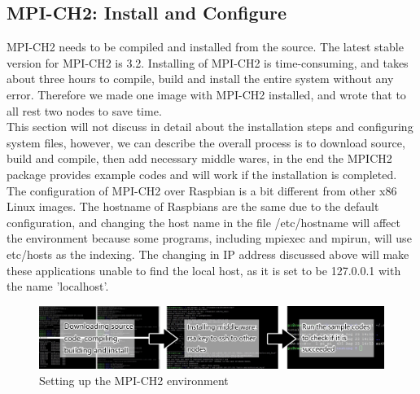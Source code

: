 \documentclass[11pt,openright,a4paper]{report}
\begin{document}
\subsection{MPI-CH2: Install and Configure}
MPI-CH2 needs to be compiled and installed from the source. The latest stable version for MPI-CH2 is 3.2. Installing of MPI-CH2 is time-consuming, and takes about three hours to compile, build and install the entire system without any error. Therefore we made one image with MPI-CH2 installed, and wrote that to all rest two nodes to save time.\\
This section will not discuss in detail about the installation steps and configuring system files, however, we can describe the overall process is to download source, build and compile, then add necessary middle wares, in the end the MPICH2 package provides example codes and will work if the installation is completed. The configuration of MPI-CH2 over Raspbian is a bit different from other x86 Linux images. The hostname of Raspbians are the same due to the default configuration, and changing the host name in the file /etc/hostname will affect the environment because some programs, including mpiexec and mpirun, will use etc/hosts as the indexing. The changing in IP address discussed above will make these applications unable to find the local host, as it is set to be 127.0.0.1 with the name 'localhost'.\\
\begin{figure}[H]
\centering
\includegraphics[width=0.9\linewidth]{picture/mpi-setup/setpsMPICH2}
\caption{Setting up the MPI-CH2 environment}
\label{fig:setpsMPICH2}
\end{figure}
\end{document}
